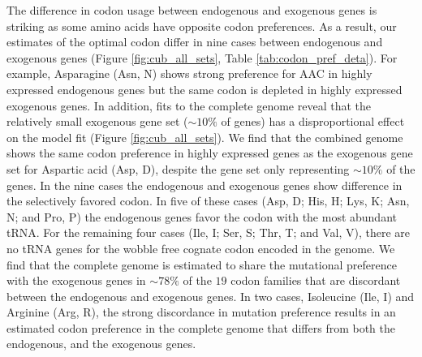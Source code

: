 \documentclass[fleqn,letterpaper]{article}
\begin{document}
The difference in codon usage between endogenous and exogenous genes is striking as some amino acids have opposite codon preferences. 
As a result, our estimates of the optimal codon differ in nine cases between endogenous and exogenous genes (Figure \ref{fig:cub_all_sets}, Table \ref{tab:codon_pref_deta}).
For example, Asparagine (Asn, N) shows strong preference for AAC in highly expressed endogenous genes but the same codon is depleted in highly expressed exogenous genes.
In addition, fits to the complete \kluyveri genome reveal that the relatively small exogenous gene set ($\sim 10\%$ of genes) has a disproportional effect on the model fit (Figure \ref{fig:cub_all_sets}).
We find that the combined genome shows the same codon preference in highly expressed genes as the exogenous gene set for Aspartic acid (Asp, D), despite the gene set only representing $\sim 10 \%$ of the genes.
In the nine cases the endogenous and exogenous genes show difference in the selectively favored codon.
In five of these cases (Asp, D; His, H; Lys, K; Asn, N; and Pro, P) the endogenous genes favor the codon with the most abundant tRNA.
For the remaining four cases (Ile, I; Ser, S; Thr, T; and Val, V), there are no tRNA genes for the wobble free cognate codon encoded in the \kluyveri genome.
We find that the complete \kluyveri genome is estimated to share the mutational preference with the exogenous genes in $\sim78\%$ of the $19$ codon families that are discordant between the endogenous and exogenous genes.
In two cases, Isoleucine (Ile, I) and Arginine (Arg, R), the strong discordance in mutation preference results in an estimated codon preference in the complete \kluyveri genome that differs from both the endogenous, and the exogenous genes.

\end{document}
